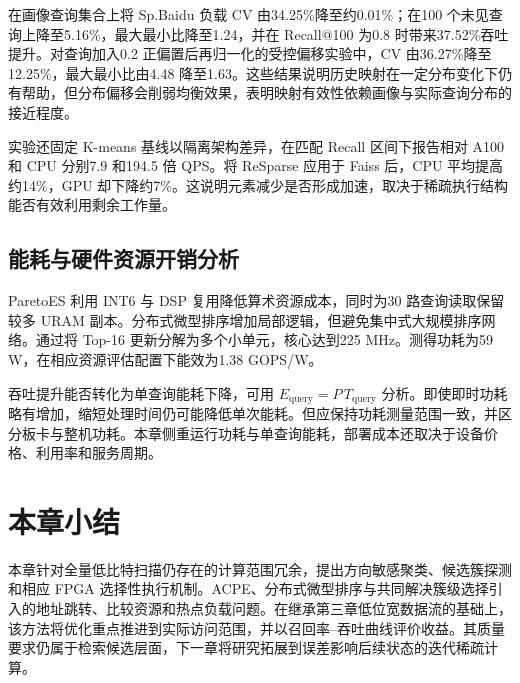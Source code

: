 

\hbalance{}在画像查询集合上将 Sp.Baidu 负载 CV 由34.25\%降至约0.01\%；在100 个未见查询上降至5.16\%，最大最小比降至1.24，并在 Recall@100 为0.8 时带来37.52\%吞吐提升。对查询加入0.2 正偏置后再归一化的受控偏移实验中，CV 由36.27\%降至12.25\%，最大最小比由4.48 降至1.63。这些结果说明历史映射在一定分布变化下仍有帮助，但分布偏移会削弱均衡效果，表明映射有效性依赖画像与实际查询分布的接近程度。

实验还固定 K-means 基线以隔离架构差异，在匹配 Recall 区间下报告相对 A100 和 CPU 分别7.9 和194.5 倍 QPS。将 ReSparse 应用于 Faiss 后，CPU 平均提高约14\%，GPU 却下降约7\%。这说明元素减少是否形成加速，取决于稀疏执行结构能否有效利用剩余工作量。

\subsection{能耗与硬件资源开销分析}
ParetoES 利用 INT6 与 DSP 复用降低算术资源成本，同时为30 路查询读取保留较多 URAM 副本。分布式微型排序增加局部逻辑，但避免集中式大规模排序网络。通过将 Top-16 更新分解为多个小单元，核心达到225 MHz。测得功耗为59 W，在相应资源评估配置下能效为1.38 GOPS/W。

吞吐提升能否转化为单查询能耗下降，可用 $E_{\mathrm{query}}=P\,T_{\mathrm{query}}$ 分析。即使即时功耗略有增加，缩短处理时间仍可能降低单次能耗。但应保持功耗测量范围一致，并区分板卡与整机功耗。本章侧重运行功耗与单查询能耗，部署成本还取决于设备价格、利用率和服务周期。




\section{本章小结}
本章针对全量低比特扫描仍存在的计算范围冗余，提出方向敏感聚类、候选簇探测和相应 FPGA 选择性执行机制。ACPE、分布式微型排序与\hbalance{}共同解决簇级选择引入的地址跳转、比较资源和热点负载问题。在继承第三章低位宽数据流的基础上，该方法将优化重点推进到实际访问范围，并以召回率--吞吐曲线评价收益。其质量要求仍属于检索候选层面，下一章将研究拓展到误差影响后续状态的迭代稀疏计算。
